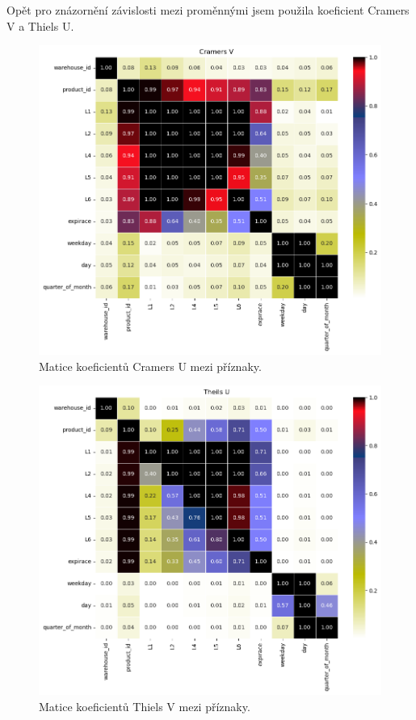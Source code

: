 Opět pro znázornění závislosti mezi proměnnými jsem použila koeficient Cramers V a Thiels U. %

\begin{figure}[hbtp!]
    \centering
    \includegraphics[width=.8\textwidth]{obrazky/zntb/cramers_u.png}
    \caption{Matice koeficientů Cramers U mezi příznaky.}
    \label{obr:nb:cramers}
\end{figure}

\begin{figure}[hbtp!]
    \centering
    \includegraphics[width=.8\textwidth]{obrazky/zntb/theils_u.png}
    \caption{Matice koeficientů Thiels V mezi příznaky.}
    \label{obr:nb:thiels}
\end{figure}

